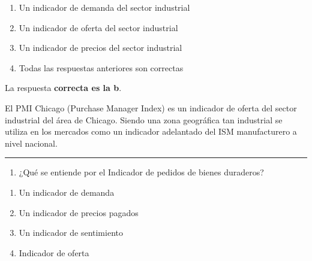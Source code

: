 \documentclass[
  letterpaper,
  DIV=11,
  numbers=noendperiod]{scrreprt}
\providecommand{\tightlist}{%
  \setlength{\itemsep}{0pt}\setlength{\parskip}{0pt}}\usepackage{longtable,booktabs,array}
\begin{document}
\begin{enumerate}
\def\labelenumi{\alph{enumi})}
\item
  Un indicador de demanda del sector industrial
\item
  Un indicador de oferta del sector industrial
\item
  Un indicador de precios del sector industrial
\item
  Todas las respuestas anteriores son correctas
\end{enumerate}

\begin{tcolorbox}[enhanced jigsaw, left=2mm, opacityback=0, colback=white, breakable, arc=.35mm, bottomrule=.15mm, rightrule=.15mm, toprule=.15mm, leftrule=.75mm, colframe=quarto-callout-tip-color-frame]
\begin{minipage}[t]{5.5mm}
\textcolor{quarto-callout-tip-color}{\faLightbulb}
\end{minipage}%
\begin{minipage}[t]{\textwidth - 5.5mm}

La respuesta \textbf{correcta es la b}.

El PMI Chicago (Purchase Manager Index) es un indicador de oferta del
sector industrial del área de Chicago. Siendo una zona geográfica tan
industrial se utiliza en los mercados como un indicador adelantado del
ISM manufacturero a nivel nacional.

\end{minipage}%
\end{tcolorbox}

\begin{center}\rule{0.5\linewidth}{0.5pt}\end{center}

\begin{enumerate}
\def\labelenumi{\arabic{enumi}.}
\setcounter{enumi}{32}
\tightlist
\item
  ¿Qué se entiende por el Indicador de pedidos de bienes duraderos?
\end{enumerate}

\begin{enumerate}
\def\labelenumi{\alph{enumi})}
\item
  Un indicador de demanda
\item
  Un indicador de precios pagados
\item
  Un indicador de sentimiento
\item
  Indicador de oferta
\end{enumerate}
\end{document}
